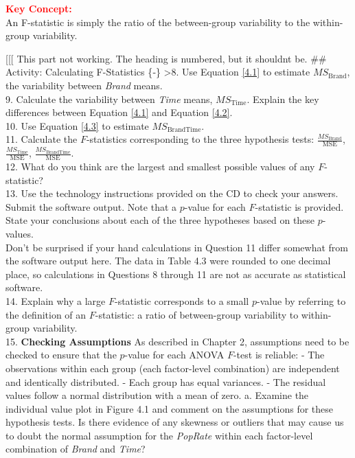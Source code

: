 \documentclass[
]{report}
\begin{document}
\large

\textbf{\textcolor{red}{Key Concept:}}\\
\color{red}
An F-statistic is simply the ratio of the between-group variability to the within-group variability.
\color{black}
\normalsize

{[}{[}{[} This part not working. The heading is numbered, but it shouldnt be.
\#\# Activity: Calculating F-Statistics \{‑\}
\textgreater8. Use Equation \ref{4.1} to estimate \(MS_{\text{Brand}}\), the variability between \emph{Brand} means.\\
9. Calculate the variability between \emph{Time} means, \(MS_{\text{Time}}\). Explain the key differences between Equation \ref{4.1} and Equation \ref{4.2}.\\
10. Use Equation \ref{4.3} to estimate \(MS_{\text{BrandTime}}\).\\
11. Calculate the \(F\)-statistics corresponding to the three hypothesis tests: \(\frac{MS_{\text{Brand}}}{\text{MSE}}\), \(\frac{MS_{\text{Time}}}{\text{MSE}}\), \(\frac{MS_{\text{BrandTime}}}{\text{MSE}}\).\\
12. What do you think are the largest and smallest possible values of any \(F\)-statistic?\\
13. Use the technology instructions provided on the CD to check your answers. Submit the software output. Note that a \(p\)-value for each \(F\)-statistic is provided. State your conclusions about each of the three hypotheses based on these \(p\)-values.\\
Don't be surprised if your hand calculations in Question 11 differ somewhat from the software output here. The data in Table 4.3 were rounded to one decimal place, so calculations in Questions 8 through 11 are not as accurate as statistical software.\\
14. Explain why a large \(F\)-statistic corresponds to a small \(p\)-value by referring to the definition of an \(F\)-statistic: a ratio of between-group variability to within-group variability.\\
15. \textbf{Checking Assumptions} As described in Chapter 2, assumptions need to be checked to ensure that the \(p\)-value for each ANOVA \(F\)-test is reliable:
- The observations within each group (each factor-level combination) are independent and identically distributed.
- Each group has equal variances.
- The residual values follow a normal distribution with a mean of zero.
a. Examine the individual value plot in Figure 4.1 and comment on the assumptions for these hypothesis tests. Is there evidence of any skewness or outliers that may cause us to doubt the normal assumption for the \emph{PopRate} within each factor-level combination of \emph{Brand} and \emph{Time}?
\end{document}
